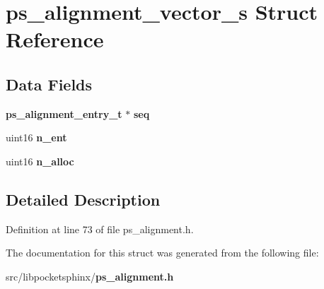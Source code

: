 \section{ps\+\_\+alignment\+\_\+vector\+\_\+s Struct Reference}
\label{structps__alignment__vector__s}
\subsection*{Data Fields}
\begin{DoxyCompactItemize}
\item 
{\bf ps\+\_\+alignment\+\_\+entry\+\_\+t} $\ast$ {\bfseries seq}\label{structps__alignment__vector__s_a5bfae302b7ca4bddde35600d157bc2a2}

\item 
uint16 {\bfseries n\+\_\+ent}\label{structps__alignment__vector__s_ac45b2f21982334d415bed78abfeba66d}

\item 
uint16 {\bfseries n\+\_\+alloc}\label{structps__alignment__vector__s_a18d4510d8a2495ac96bb0c295b725c83}

\end{DoxyCompactItemize}


\subsection{Detailed Description}


Definition at line 73 of file ps\+\_\+alignment.\+h.



The documentation for this struct was generated from the following file\+:\begin{DoxyCompactItemize}
\item 
src/libpocketsphinx/{\bf ps\+\_\+alignment.\+h}\end{DoxyCompactItemize}

